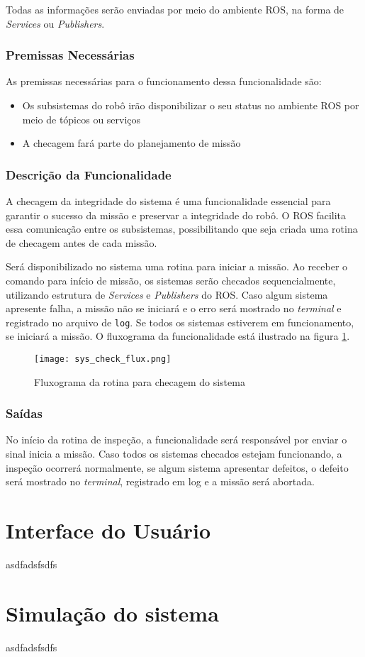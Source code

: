 Todas as informações serão enviadas por meio do ambiente ROS, na forma de \textit{Services} ou \textit{Publishers}.

\subsubsection{Premissas Necessárias}
As premissas necessárias para o funcionamento dessa funcionalidade são:
\begin{itemize}
	\item Os subsistemas do robô irão disponibilizar o seu status no ambiente ROS por meio de tópicos ou serviços
	\item A checagem fará parte do planejamento de missão
\end{itemize}

\subsubsection{Descrição da Funcionalidade}
A checagem da integridade do sistema é uma funcionalidade essencial para garantir o sucesso da missão e preservar a integridade do robô. O ROS facilita essa comunicação entre os subsistemas, possibilitando que seja criada uma rotina de checagem antes de cada missão.

Será disponibilizado no sistema uma rotina para iniciar a missão. Ao receber o comando para início de missão, os sistemas serão checados sequencialmente, utilizando estrutura de \textit{Services} e \textit{Publishers} do ROS. Caso algum sistema apresente falha, a missão não se iniciará e o erro será mostrado no \textit{terminal} e registrado no arquivo de \verb|log|. Se todos os sistemas estiverem em funcionamento, se iniciará a missão. O fluxograma da funcionalidade está ilustrado na figura \ref{fig:sys_check_flux}.	
\begin{figure}[h]
	\centering
	\texttt{[image: sys\_check\_flux.png]}
	\caption{Fluxograma da rotina para checagem do sistema}
	\label{fig:sys_check_flux}
\end{figure} 


\subsubsection{Saídas}
No início da rotina de inspeção, a funcionalidade será responsável por enviar o sinal inicia a missão. Caso todos os sistemas checados estejam funcionando, a inspeção ocorrerá normalmente, se algum sistema apresentar defeitos, o defeito será mostrado no \textit{terminal}, registrado em log e a missão será abortada.
\section{Interface do Usuário}
\label{sec:ui}
asdfadsfsdfs

\section{Simulação do sistema}
\label{sec:sim}
asdfadsfsdfs


